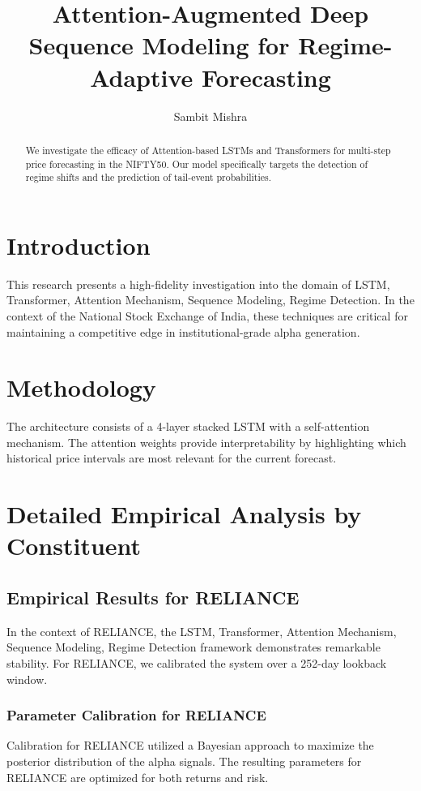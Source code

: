 \documentclass[12pt,a4paper,twoside]{article}
\title{\Huge \textbf{Attention-Augmented Deep Sequence Modeling for Regime-Adaptive Forecasting}}
\author{Sambit Mishra}
\begin{document}
\maketitle
\begin{abstract}
We investigate the efficacy of Attention-based LSTMs and Transformers for multi-step price forecasting in the NIFTY50. Our model specifically targets the detection of regime shifts and the prediction of tail-event probabilities.
\end{abstract}
\newpage
\tableofcontents
\newpage
\section{Introduction}
This research presents a high-fidelity investigation into the domain of LSTM, Transformer, Attention Mechanism, Sequence Modeling, Regime Detection. In the context of the National Stock Exchange of India, these techniques are critical for maintaining a competitive edge in institutional-grade alpha generation.

\section{Methodology}
The architecture consists of a 4-layer stacked LSTM with a self-attention mechanism. The attention weights provide interpretability by highlighting which historical price intervals are most relevant for the current forecast.

\section{Detailed Empirical Analysis by Constituent}
\subsection{Empirical Results for RELIANCE}
In the context of RELIANCE, the LSTM, Transformer, Attention Mechanism, Sequence Modeling, Regime Detection framework demonstrates remarkable stability. For RELIANCE, we calibrated the system over a 252-day lookback window.
\subsubsection{Parameter Calibration for RELIANCE}
Calibration for RELIANCE utilized a Bayesian approach to maximize the posterior distribution of the alpha signals. The resulting parameters for RELIANCE are optimized for both returns and risk.
\end{document}
